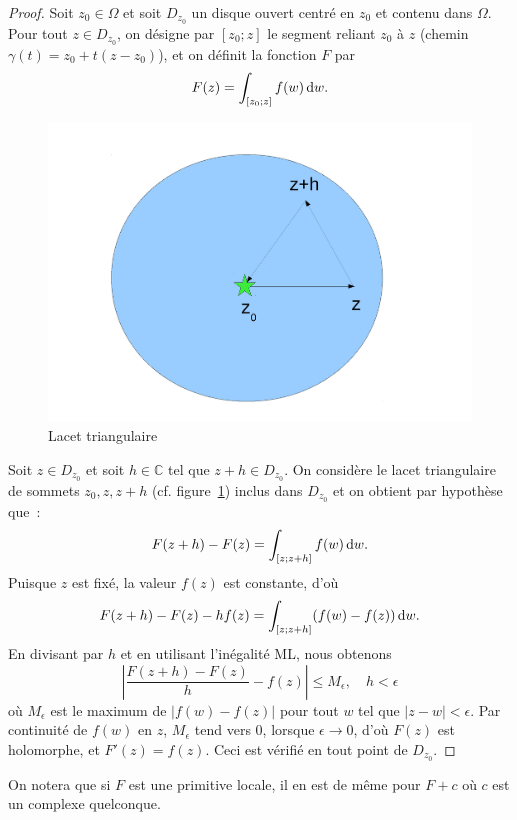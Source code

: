 \begin{proof}
Soit $z_0 \in \Omega$ et soit $D_{z_0}$ un disque ouvert centré en $z_0$ et
contenu dans $\Omega$. Pour tout $z \in D_{z_0}$, on désigne par $[z_0 ; z]$ le segment reliant $z_0$ à $z$ (chemin $\gamma(t)=z_0 + t(z-z_0)$), et on définit la fonction $F$ par
\[ F(z) = \int_{[z_0 ; z]} f(w) \mathop{}\mathopen{}\mathrm{d} w.
\]
\begin{figure}[ht]
 \begin{center}
\includegraphics[scale=0.3]{images/morera.pdf}
\caption{Lacet triangulaire}\label{fig:morera}
\end{center}
\end{figure}
Soit $z \in D_{z_0}$ et soit $h \in \mathbb{C}$ tel que
$z+h \in D_{z_0}$. On considère le lacet triangulaire de sommets $z_0,z,z+h$ (cf. figure~\ref{fig:morera}) inclus dans $D_{z_0}$ et on obtient par hypothèse que~:
\[F(z+h)-F(z) = \int_{[z ; z+h]} f(w) \mathop{}\mathopen{}\mathrm{d} w.\]
Puisque $z$ est fixé, la valeur $f(z)$ est constante, d'où
\[F(z+h)-F(z) - h f(z)= \int_{[z ; z+h]} (f(w)-f(z)) \mathop{}\mathopen{}\mathrm{d} w.\]
En divisant par $h$ et en utilisant l'inégalité ML, nous obtenons
\[ \left \lvert \frac{F(z+h)-F(z)}{h} - f(z)\right\rvert \leq M_\epsilon, \quad h<\epsilon \]
où $M_\epsilon$ est le maximum de $\lvert f(w)-f(z)\rvert$ pour tout $w$ tel que $\lvert z -w \rvert <\epsilon$.
Par continuité de $f(w)$ en $z$, $M_\epsilon$ tend vers $0$, lorsque $\epsilon \to 0$, d'où $F(z)$ est holomorphe, et $F'(z)=f(z)$. Ceci est vérifié en tout point de
$D_{z_0}$. 
\end{proof}
On notera que si $F$ est une primitive locale, il en est de même pour $F+c$ où
$c$ est un complexe quelconque.

